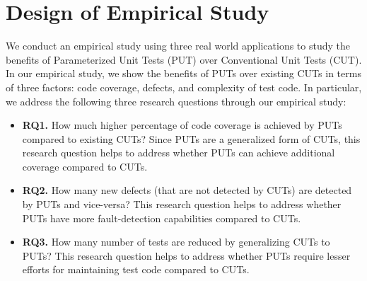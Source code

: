\section{Design of Empirical Study}

We conduct an empirical study using three real world applications to study the benefits of Parameterized Unit Tests (PUT) over Conventional Unit Tests (CUT). 
In our empirical study, we show the benefits of PUTs over existing CUTs in terms of three factors: code coverage, defects, and complexity of test code. 
In particular, we address the following three research questions through our empirical study:

\begin{itemize}
	\item \textbf{RQ1.} How much higher percentage of code coverage is achieved by PUTs compared to existing CUTs? Since PUTs are a generalized form of CUTs, this research question helps to address whether PUTs can achieve additional coverage compared to CUTs.
	\item \textbf{RQ2.} How many new defects (that are not detected by CUTs) are detected by PUTs and vice-versa? This research question helps to address whether PUTs have more fault-detection capabilities compared to CUTs.
	\item \textbf{RQ3.} How many number of tests are reduced by generalizing CUTs to PUTs? This research question helps to address whether PUTs require lesser efforts for maintaining test code compared to CUTs.
\end{itemize}



